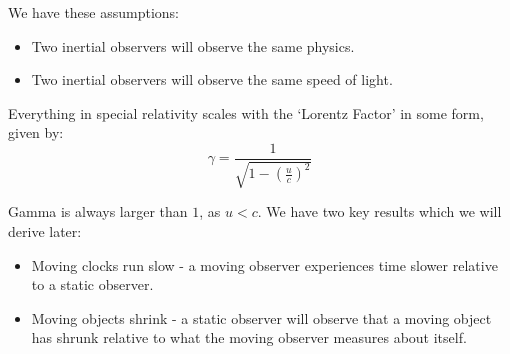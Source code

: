 We have these assumptions:
\begin{itemize}
    \item Two inertial observers will observe the same physics.
    \item Two inertial observers will observe the same speed of light.
\end{itemize}

Everything in special relativity scales with the `Lorentz Factor' in some form, given by:
\[
    \gamma = \dfrac{1}{\sqrt{1 - \left(\frac{u}{c}\right)^2}}
\]

Gamma is always larger than $1$, as $u < c$. We have two key results which we will derive later:
\begin{itemize}
    \item Moving clocks run slow - a moving observer experiences time slower relative to a static observer.
    \item Moving objects shrink - a static observer will observe that a moving object has shrunk relative to what the moving observer measures about itself.
\end{itemize}

